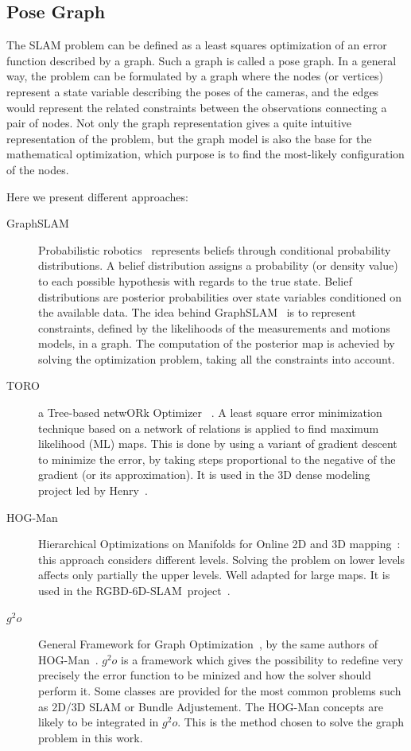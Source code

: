\subsection{Pose Graph}

The \gls{SLAM} problem can be defined as a least squares optimization of an error function described by a graph. Such a graph is called a pose graph. In a general way, the problem can be formulated by a graph where the nodes (or vertices) represent a state variable describing the poses of the cameras, and the edges would represent the related constraints between the observations connecting a pair of nodes. Not only the graph representation gives a quite intuitive representation of the problem, but the graph model is also the base for the mathematical optimization, which purpose is to find the most-likely configuration of the nodes.

Here we present different approaches:

\begin{description}
\item[GraphSLAM] Probabilistic robotics~\cite{Thrun_2005} represents beliefs through conditional probability distributions. A belief distribution assigns a probability (or density value) to each possible hypothesis with regards to the true state. Belief distributions are posterior probabilities over state variables conditioned on the available data. The idea behind GraphSLAM~\cite{Thrun05_GraphSLAM} is to represent constraints, defined by the likelihoods of the measurements and motions models, in a graph. The computation of the posterior map is achevied by solving the optimization problem, taking all the constraints into account.
\item[TORO] a Tree-based netwORk Optimizer ~\cite{grisetti07rss}. A least square error minimization technique based on a network of relations is applied to find maximum likelihood (ML) maps. This is done by using a variant of gradient descent to minimize the error, by taking steps proportional to the negative of the gradient (or its approximation). It is used in the 3D dense modeling project led by Henry~\cite{Henry_RGBD_2010}.
\item[HOG-Man] Hierarchical Optimizations on Manifolds for Online 2D and 3D mapping~\cite{hogman_2010}: this approach considers different levels. Solving the problem on lower levels affects only partially the upper levels. Well adapted for large maps. It is used in the RGBD-6D-SLAM~project~\cite{engelhard11euron-workshop}.
\item[$g^2o$] General Framework for Graph Optimization~\cite{g2o_2011}, by the same authors of HOG-Man~\cite{hogman_2010}. $g^2o$ is a framework which gives the possibility to redefine very precisely the error function to be minized and how the solver should perform it. Some classes are provided for the most common problems such as 2D/3D \gls{SLAM} or Bundle Adjustement. The HOG-Man concepts are likely to be integrated in $g^2o$. This is the method chosen to solve the graph problem in this work.
\end{description}


